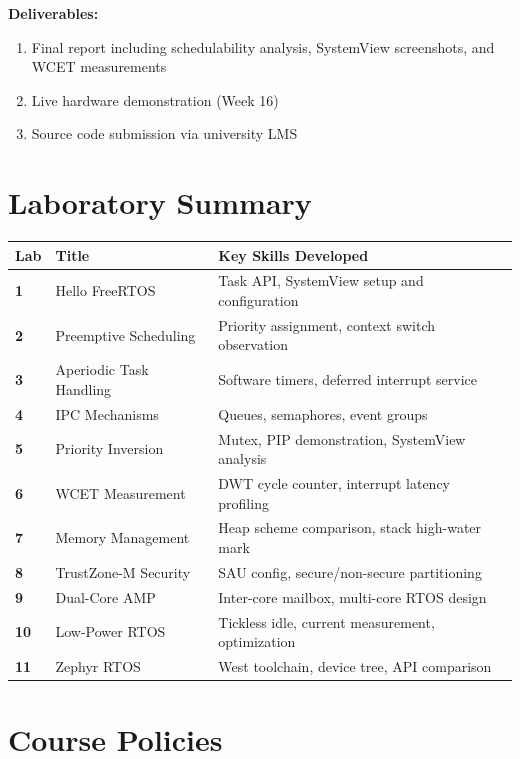 \documentclass[12pt, a4paper]{article}
\begin{document}
\noindent\textbf{Deliverables:}
\begin{enumerate}[noitemsep]
  \item Final report including schedulability analysis, SystemView screenshots, and WCET measurements
  \item Live hardware demonstration (Week 16)
  \item Source code submission via university LMS
\end{enumerate}

\section{Laboratory Summary}

\begin{tabular}{@{}>{\centering\bfseries}p{1.2cm} p{5cm} p{7cm}@{}}
  \toprule
  \textbf{Lab} & \textbf{Title} & \textbf{Key Skills Developed} \\
  \midrule
  1  & Hello FreeRTOS            & Task API, SystemView setup and configuration \\
  2  & Preemptive Scheduling     & Priority assignment, context switch observation \\
  3  & Aperiodic Task Handling   & Software timers, deferred interrupt service \\
  4  & IPC Mechanisms            & Queues, semaphores, event groups \\
  5  & Priority Inversion        & Mutex, PIP demonstration, SystemView analysis \\
  6  & WCET Measurement          & DWT cycle counter, interrupt latency profiling \\
  7  & Memory Management         & Heap scheme comparison, stack high-water mark \\
  8  & TrustZone-M Security      & SAU config, secure/non-secure partitioning \\
  9  & Dual-Core AMP             & Inter-core mailbox, multi-core RTOS design \\
  10 & Low-Power RTOS            & Tickless idle, current measurement, optimization \\
  11 & Zephyr RTOS               & West toolchain, device tree, API comparison \\
  \bottomrule
\end{tabular}

\section{Course Policies}
\end{document}
